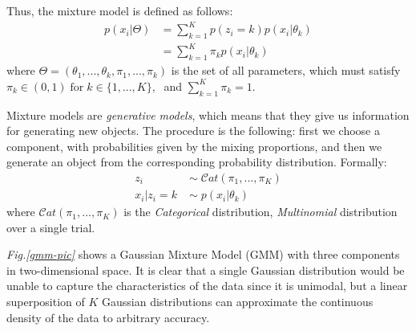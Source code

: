 Thus, the mixture model is defined as follows:
\begin{equation} \label{mix-model-f-mm}
	\begin{aligned}
		p(x_{i}|\Theta) & = \sum_{k=1}^{K} p(z_{i} = k) p(x_{i}|\theta_{k}) \\
			& = \sum_{k=1}^{K}\pi_{k} p(x_{i}|\theta_{k})
	\end{aligned}
\end{equation}
where $\Theta = (\theta_{1},..., \theta_{k}, \pi_{1},..., \pi_{k})$ is the set of all parameters, which must satisfy $\pi_{k} \in (0, 1) \; \text{for} \; k \in \lbrace 1,...,K \rbrace, \;$ and $\sum_{k=1}^{K}\pi_{k} = 1$.

Mixture models are \emph{generative models}, which means that they give us information for generating new objects. The procedure is the following: first we choose a component, with probabilities given by the mixing proportions, and then we generate an object from the corresponding probability distribution. Formally:
\begin{equation}
	\begin{aligned}
		z_{i} \; & \sim \; \mathcal{C}at(\pi_{1},...,\pi_{K}) \\
		x_{i} | z_{i}=k \; & \sim \; p(x_{i}|\theta_{k})
	\end{aligned}
\end{equation}
where $\mathcal{C}at(\pi_{1},...,\pi_{K})$ is the \emph{Categorical} distribution, \ie \emph{Multinomial} distribution over a single trial.

\emph{Fig.\ref{gmm-pic}} shows a Gaussian Mixture Model (GMM) with three components in two-dimensional space. It is clear that a single Gaussian distribution would be unable to capture the characteristics of the data since it is unimodal, but a linear superposition of $K$ Gaussian distributions can approximate the continuous density of the data to arbitrary accuracy. 

